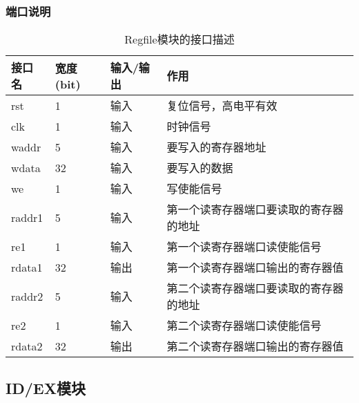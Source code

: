 \subsubsection{端口说明}
\begin{table}[H]
	\centering
	\caption{Regfile模块的接口描述}
	\begin{tabular}{|l|l|l|l|}
		\hline
		接口名 & 宽度(bit) & 输入/输出 & 作用 \\
		\hline
		rst & 1 & 输入 & 复位信号，高电平有效 \\
		\hline
		clk & 1 & 输入 & 时钟信号 \\
		\hline
		waddr & 5 & 输入 & 要写入的寄存器地址 \\
		\hline
		wdata & 32 & 输入 & 要写入的数据 \\
		\hline
		we & 1 & 输入 & 写使能信号 \\
		\hline
		raddr1 & 5 & 输入 & 第一个读寄存器端口要读取的寄存器的地址 \\
		\hline
		re1 & 1 & 输入 & 第一个读寄存器端口读使能信号 \\
		\hline
		rdata1 & 32 & 输出 & 第一个读寄存器端口输出的寄存器值 \\
		\hline
		raddr2 & 5 & 输入 & 第二个读寄存器端口要读取的寄存器的地址 \\
		\hline
		re2 & 1 & 输入 & 第二个读寄存器端口读使能信号 \\
		\hline
		rdata2 & 32 & 输出 & 第二个读寄存器端口输出的寄存器值 \\
		\hline
	\end{tabular}
\end{table}
\subsection{ID/EX模块}
